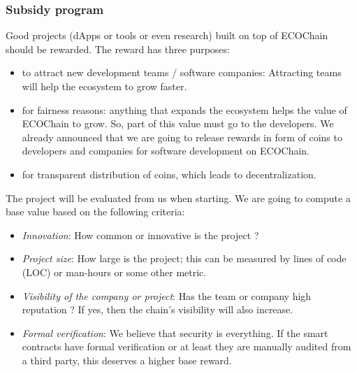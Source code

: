 \documentclass{article}
\begin{document}
\subsubsection{Subsidy program}
Good projects (dApps or tools or even research) built on top of ECOChain should be rewarded. The reward has three purposes:
\begin{itemize}
\item to attract new development teams / software companies: Attracting teams will help the ecosystem to grow faster.
\item for fairness reasons: anything that expands the ecosystem helps the value of ECOChain to grow. So, part of this value must go to the developers. We already announced that we are going to release rewards in form of coins to developers and companies for software development on ECOChain.
\item for transparent distribution of coins, which leads to decentralization.
\end{itemize}
The project will be evaluated from us when starting.  We are going to compute a base value based on the following criteria:
\begin{itemize}
\item \emph{Innovation}: How common or innovative is the project ?
\item \emph{Project size}: How large is the project; this can be measured by lines of code (LOC)  or man-hours or some other metric.
\item \emph{Visibility of the company or project}: Has the team or company high reputation ?  If yes, then the chain’s visibility will also increase.
\item \emph{Formal verification}: We believe that security is everything. If the smart contracts have formal verification or at least they are manually audited from a third party, this deserves a higher base reward.
\end{itemize}
\end{document}
